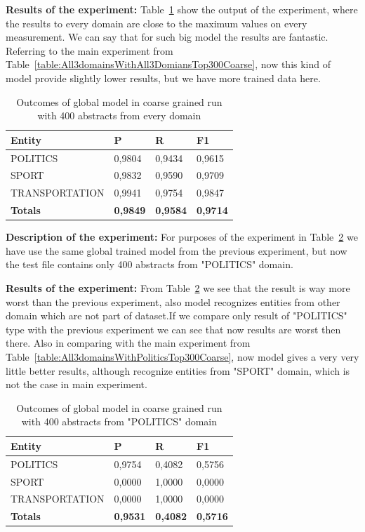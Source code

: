 \documentclass[thesis=M,english]{FITthesis}[2018/05/30]
\begin{document}
\textbf{Results of the experiment:} Table~\ref{table:400GlobalDomainWithAllAbstractsTop400Coarse} show the output of the experiment, where the results to every domain are close to the maximum values on every measurement. We can say that for such big model the results are fantastic. Referring to the main experiment from Table~\ref{table:All3domainsWithAll3DomiansTop300Coarse}, now this kind of model provide slightly lower results, but we have more trained data here.

	\begin{table}[H]\centering
		\begin{tabular}{|l|l|l|l|}
			\hline {\textbf{Entity}} & {\textbf{P}} & {\textbf{R}} & {\textbf{F1}}\\\hline
				POLITICS & 0,9804 & 0,9434 & 0,9615\\
				SPORT & 0,9832 & 0,9590 & 0,9709\\
				TRANSPORTATION & 0,9941 & 0,9754 & 0,9847\\\hline
				\textbf{Totals} & \textbf{0,9849} & \textbf{0,9584} & \textbf{0,9714}\\\hline
		\end{tabular}
		\caption{Outcomes of global model in coarse grained run with 400 abstracts from every domain \label{table:400GlobalDomainWithAllAbstractsTop400Coarse}}
	\end{table}

\textbf{Description of the experiment:} For purposes of the experiment in Table~\ref{table:400GlobalDomainWithPoliticsTop400Coarse} we have use the same global trained model from the previous experiment, but now the test file contains only 400 abstracts from "POLITICS" domain. 

\textbf{Results of the experiment:} From Table~\ref{table:400GlobalDomainWithPoliticsTop400Coarse} we see that the result is way more worst than the previous experiment, also model recognizes entities from other domain which are not part of dataset.If we compare only result of "POLITICS" type with the previous experiment we can see that now results are worst then there. Also in comparing with the main experiment from Table~\ref{table:All3domainsWithPoliticsTop300Coarse}, now model gives a very very little better results, although recognize entities from "SPORT" domain, which is not the case in main experiment.

	\begin{table}[H]\centering
		\begin{tabular}{|l|l|l|l|}
			\hline {\textbf{Entity}} & {\textbf{P}} & {\textbf{R}} & {\textbf{F1}}\\\hline
				POLITICS & 0,9754 & 0,4082 & 0,5756\\
				SPORT & 0,0000 & 1,0000 & 0,0000\\
				TRANSPORTATION & 0,0000 & 1,0000 & 0,0000\\\hline
				\textbf{Totals} & \textbf{0,9531} & \textbf{0,4082} & \textbf{0,5716}\\\hline
		\end{tabular}
		\caption{Outcomes of global model in coarse grained run with 400 abstracts from "POLITICS" domain \label{table:400GlobalDomainWithPoliticsTop400Coarse}}
	\end{table}
\end{document}
